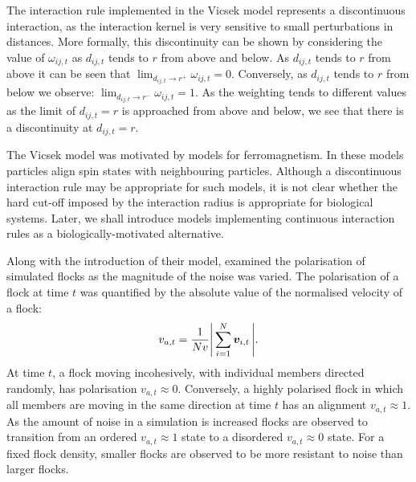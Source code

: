 The interaction rule implemented in the Vicsek model represents a discontinuous
interaction, as the interaction kernel is very sensitive to small perturbations in
distances.  More formally, this discontinuity can be shown by considering the value of
$\omega_{ij, t}$ as $d_{ij,t}$ tends to $r$ from above and below.  As $d_{ij,t}$ tends to
$r$ from above it can be seen that $\lim_{d_{ij,t} \rightarrow r^+} \omega_{ij,t} = 0$.
Conversely, as $d_{ij,t}$ tends to $r$ from below we observe: $\lim_{d_{ij,t} \rightarrow
r^-} \omega_{ij,t} = 1$. As the weighting tends to different values as the limit of
$d_{ij,t}=r$ is approached from above and below, we see that there is a discontinuity at
$d_{ij,t}=r$.

The Vicsek model was motivated by models for ferromagnetism. In these models
particles align spin states with neighbouring particles. Although a discontinuous
interaction rule may be appropriate for such models, it is not clear whether the
hard cut-off imposed by the interaction radius is appropriate for biological systems.
Later, we shall introduce models implementing continuous interaction rules as a
biologically-motivated alternative.

Along with the introduction of their model, \cite{vicsek95} examined the polarisation of
simulated flocks as the magnitude of the noise was varied. The polarisation of a flock at
time $t$ was quantified by the absolute value of the normalised velocity of a flock:
\begin{equation}
    v_{a,t} = \frac{1}{Nv} \abs{\,\sum_{i=1}^N \bm{v}_{i,t}\,}.
\end{equation}
At time $t$, a flock moving incohesively, with individual members directed randomly, has
polarisation $v_{a,t}\approx0$. Conversely, a highly polarised flock in which all members
are moving in the same direction at time $t$ has an alignment $v_{a,t}\approx1$. As the
amount of noise in a simulation is increased flocks are observed to transition from an
ordered $v_{a,t}\approx1$ state to a disordered $v_{a,t}\approx0$ state. For a fixed flock
density, smaller flocks are observed to be more resistant to noise than larger flocks.


